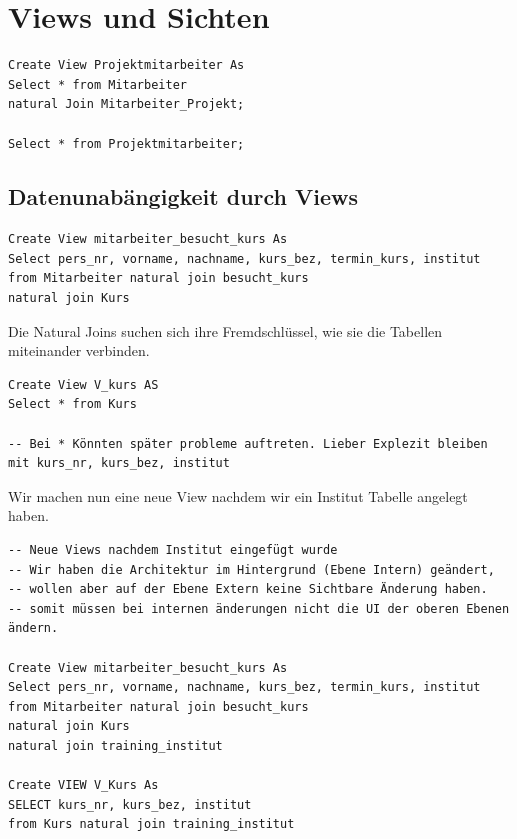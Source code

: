 \documentclass[a4paper]{article}
\title{\docTitle}
\author{Moritz}
\date{\today}
\begin{document}
\maketitle
\tableofcontents


\section{Views und Sichten}

\begin{lstlisting}
Create View Projektmitarbeiter As
Select * from Mitarbeiter
natural Join Mitarbeiter_Projekt;

Select * from Projektmitarbeiter;
\end{lstlisting}


\subsection{Datenunabängigkeit durch Views}

\begin{lstlisting}
Create View mitarbeiter_besucht_kurs As
Select pers_nr, vorname, nachname, kurs_bez, termin_kurs, institut 
from Mitarbeiter natural join besucht_kurs
natural join Kurs
\end{lstlisting}

Die Natural Joins suchen sich ihre Fremdschlüssel, wie sie die Tabellen miteinander verbinden.

\begin{lstlisting}
Create View V_kurs AS
Select * from Kurs

-- Bei * Könnten später probleme auftreten. Lieber Explezit bleiben mit kurs_nr, kurs_bez, institut
\end{lstlisting}

Wir machen nun eine neue View nachdem wir ein Institut Tabelle angelegt haben.

\begin{lstlisting}
-- Neue Views nachdem Institut eingefügt wurde
-- Wir haben die Architektur im Hintergrund (Ebene Intern) geändert,
-- wollen aber auf der Ebene Extern keine Sichtbare Änderung haben.
-- somit müssen bei internen änderungen nicht die UI der oberen Ebenen ändern.

Create View mitarbeiter_besucht_kurs As
Select pers_nr, vorname, nachname, kurs_bez, termin_kurs, institut 
from Mitarbeiter natural join besucht_kurs
natural join Kurs
natural join training_institut

Create VIEW V_Kurs As
SELECT kurs_nr, kurs_bez, institut
from Kurs natural join training_institut
\end{lstlisting}
\end{document}

